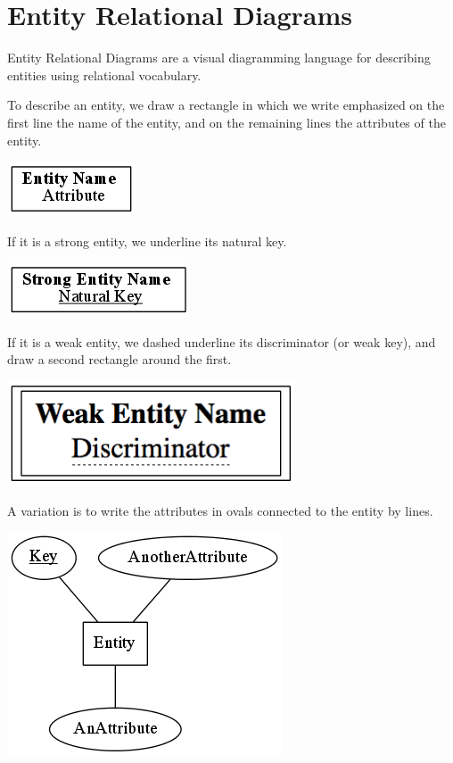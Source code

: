 \chapter{Entity Relational Diagrams}

Entity Relational Diagrams are a visual diagramming language for
describing entities using relational vocabulary.

To describe an entity, we draw a rectangle in which we write
emphasized on the first line the name of the entity, and on the
remaining lines the attributes of the entity.  

\includegraphics{figs/entity.png}

If it is a strong entity, we underline its natural key.  

\includegraphics{figs/strong_entity.png}

If it is a weak entity, we dashed underline its discriminator (or weak
key), and draw a second rectangle around the first.

\includegraphics[scale=0.7]{figs/weak_entity.png}

A variation is to write the attributes in ovals connected to the
entity by lines.

\includegraphics[scale=0.8]{figs/alternate_entity.png}

